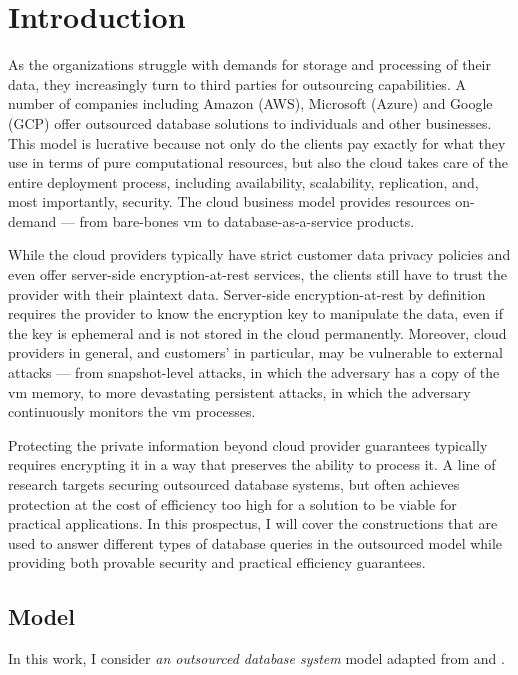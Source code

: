 \chapter{Introduction}
\thispagestyle{myheadings}

	As the organizations struggle with demands for storage and processing of their data, they increasingly turn to third parties for outsourcing capabilities.
	A number of companies including Amazon (AWS), Microsoft (Azure) and Google (GCP) offer outsourced database solutions to individuals and other businesses.
	This model is lucrative because not only do the clients pay exactly for what they use in terms of pure computational resources, but also the cloud takes care of the entire deployment process, including availability, scalability, replication, and, most importantly, security.
	The cloud business model provides resources on-demand --- from bare-bones \acrshort{vm} to database-as-a-service products.

	While the cloud providers typically have strict customer data privacy policies and even offer server-side encryption-at-rest services, the clients still have to trust the provider with their plaintext data.
	Server-side encryption-at-rest by definition requires the provider to know the encryption key to manipulate the data, even if the key is ephemeral and is not stored in the cloud permanently.
	Moreover, cloud providers in general, and customers'  in particular, may be vulnerable to external attacks --- from snapshot-level attacks, in which the adversary has a copy of the \acrshort{vm} memory, to more devastating persistent attacks, in which the adversary continuously monitors the \acrshort{vm} processes.

	Protecting the private information beyond cloud provider guarantees typically requires encrypting it in a way that preserves the ability to process it.
	A line of research targets securing outsourced database systems, but often achieves protection at the cost of efficiency too high for a solution to be viable for practical applications.
	In this prospectus, I will cover the constructions that are used to answer different types of database queries in the outsourced model while providing both provable security and practical efficiency guarantees.

	\section{Model}

		In this work, I consider \emph{an outsourced database system} model adapted from \cite{generic-attacks-kellaris} and \cite{epsolute}.

